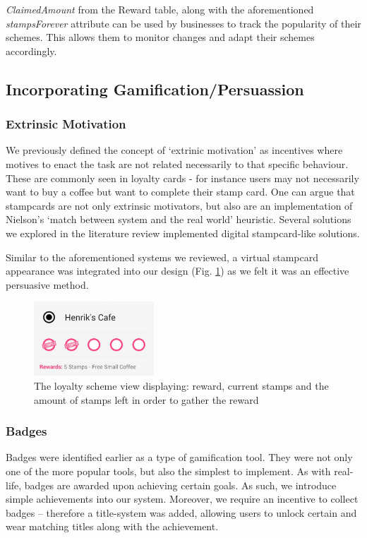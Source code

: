 \emph{ClaimedAmount} from the Reward table, along with the aforementioned \emph{stampsForever} attribute can be used by businesses to track the popularity of their schemes. This allows them to monitor changes and adapt their schemes accordingly.

\newpage
\subsection{Incorporating Gamification/Persuassion}
\subsubsection{Extrinsic Motivation}
We previously defined the concept of `extrinic motivation' as incentives where motives to enact the task are not related necessarily to that specific behaviour. These are commonly seen in loyalty cards - for instance users may not necessarily want to buy a coffee but want to complete their stamp card. One can argue that stampcards are not only extrinsic motivators, but also are an implementation of Nielson's `match between system and the real world' heuristic. Several solutions we explored in the literature review implemented digital stampcard-like solutions.

Similar to the aforementioned systems we reviewed, a virtual stampcard appearance was integrated into our design (Fig. \ref{fig:extrinsicmotivation}) as we felt it was an effective persuasive method. 
\begin{figure}[H]
 \centering
  \includegraphics[width=0.40\textwidth]{img/stampcardprogress.jpg}
     \caption{The loyalty scheme view displaying: reward, current stamps and the amount of stamps left in order to gather the reward}
     \label{fig:extrinsicmotivation}
\end{figure}
\subsubsection{Badges}
Badges were identified earlier as a type of gamification tool. They were not only one of the more popular tools, but also the simplest to implement. As with real-life, badges are awarded upon achieving certain goals. As such, we introduce simple achievements into our system. Moreover, we require an incentive to collect badges -- therefore a title-system was added, allowing users to unlock certain and wear matching titles along with the achievement.

